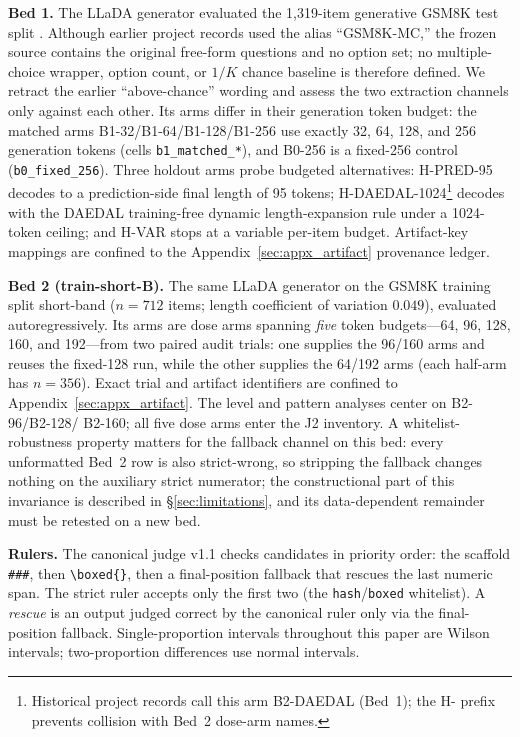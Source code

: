 \documentclass{article}
\begin{document}
\textbf{Bed 1.}  The LLaDA generator evaluated the 1{,}319-item generative
GSM8K test split \citep{cobbe2021gsm8k}.  Although earlier project records
used the alias ``GSM8K-MC,'' the frozen source contains the original free-form
questions and no option set; no multiple-choice wrapper, option count, or
$1/K$ chance baseline is therefore defined.  We retract the earlier
``above-chance'' wording and assess the two extraction channels only against
each other.
Its arms differ in their generation token budget: the matched arms
\textsc{B1-32}/\textsc{B1-64}/\textsc{B1-128}/\textsc{B1-256} use
exactly 32, 64, 128, and 256 generation tokens (cells
\texttt{b1\_matched\_*}), and \textsc{B0-256} is a fixed-256 control
(\texttt{b0\_fixed\_256}).  Three holdout arms probe budgeted
alternatives: \textsc{H-PRED-95} decodes to a prediction-side final length of
95 tokens; \textsc{H-DAEDAL-1024}\footnote{Historical project records call
this arm \textsc{B2-DAEDAL} (Bed~1); the \textsc{H-} prefix prevents collision with
Bed~2 dose-arm names.} decodes with the DAEDAL
\citep{li2025daedal} training-free dynamic length-expansion rule under a
1024-token ceiling; and \textsc{H-VAR} stops at a variable per-item budget.
Artifact-key mappings are confined to the
Appendix~\ref{sec:appx_artifact} provenance ledger.

\textbf{Bed 2 (train-short-B).}  The same LLaDA generator on the GSM8K
training split short-band ($n=712$ items; length coefficient of variation
$0.049$), evaluated autoregressively.  Its arms are dose arms spanning
\emph{five} token budgets---64, 96, 128, 160, and 192---from two paired audit
trials: one supplies the 96/160 arms and reuses the fixed-128 run, while the
other supplies the 64/192 arms (each half-arm has $n{=}356$).  Exact trial and
artifact identifiers are confined to Appendix~\ref{sec:appx_artifact}.
The level and pattern analyses center on \textsc{B2-96}/\textsc{B2-128}/
\textsc{B2-160}; all five dose arms enter the J2 inventory.  A
whitelist-robustness property
matters for the fallback channel on
this bed: every unformatted Bed~2 row is also strict-wrong, so stripping the
fallback changes nothing on the auxiliary strict numerator; the
constructional part of this invariance is described in \S\ref{sec:limitations},
and its data-dependent remainder must be retested on a new bed.

\textbf{Rulers.}  The canonical judge v1.1 checks candidates in priority
order: the scaffold \texttt{\#\#\#}, then \texttt{\textbackslash boxed\{\}}, then a
final-position fallback that rescues the last numeric span.  The strict ruler
accepts only the first two (the \texttt{hash}/\texttt{boxed} whitelist).  A
\emph{rescue} is an output judged correct by the canonical ruler only via the
final-position fallback.  Single-proportion intervals throughout this paper are
Wilson intervals; two-proportion differences use normal intervals.
\end{document}
